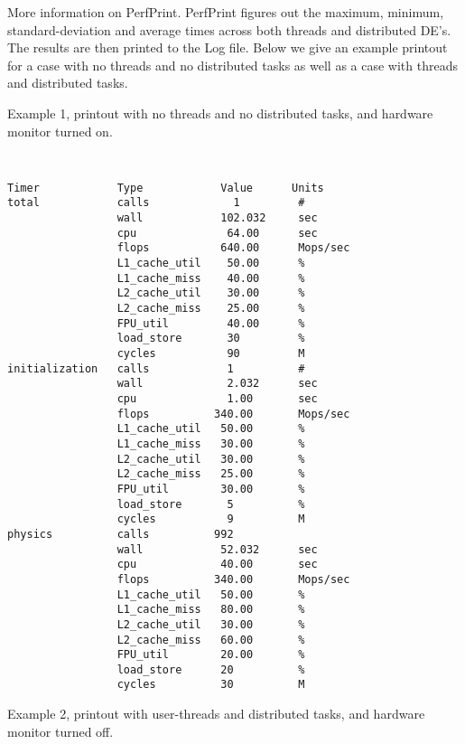 More information on PerfPrint. PerfPrint figures out the maximum, minimum, standard-deviation
and average times across both threads and distributed DE's. The results are then 
printed to the Log file. Below we give an example printout for a case with
no threads and no distributed tasks as well as a case with threads and distributed
tasks.

Example 1, printout with no threads and no distributed tasks, and
hardware monitor turned on.
{\tt
\begin{verbatim}
Timer            Type            Value      Units
total            calls             1         #
                 wall            102.032     sec
                 cpu              64.00      sec
                 flops           640.00      Mops/sec
                 L1_cache_util    50.00      %      
                 L1_cache_miss    40.00      %      
                 L2_cache_util    30.00      %      
                 L2_cache_miss    25.00      %      
                 FPU_util         40.00      %      
                 load_store       30         %
                 cycles           90         M
initialization   calls            1          #
                 wall             2.032      sec
                 cpu              1.00       sec
                 flops          340.00       Mops/sec
                 L1_cache_util   50.00       %      
                 L1_cache_miss   30.00       %      
                 L2_cache_util   30.00       %      
                 L2_cache_miss   25.00       %      
                 FPU_util        30.00       %      
                 load_store       5          %
                 cycles           9          M
physics          calls          992
                 wall            52.032      sec
                 cpu             40.00       sec
                 flops          340.00       Mops/sec
                 L1_cache_util   50.00       %      
                 L1_cache_miss   80.00       %      
                 L2_cache_util   30.00       %      
                 L2_cache_miss   60.00       %      
                 FPU_util        20.00       %      
                 load_store      20          %
                 cycles          30          M
\end{verbatim}
}

Example 2, printout with user-threads and distributed tasks, and
hardware monitor turned off.

